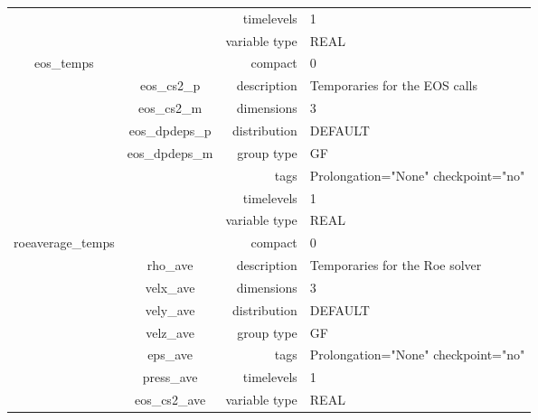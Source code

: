 \begin{tabular*}{150mm}{|c|c@{\extracolsep{\fill}}|rl|}
 &  & timelevels & 1 \\ 
 &  & variable type & REAL \\ 
\hline 
eos\_temps &  & compact & 0 \\ 
 & eos\_cs2\_p & description & Temporaries for the EOS calls \\ 
 & eos\_cs2\_m & dimensions & 3 \\ 
 & eos\_dpdeps\_p & distribution & DEFAULT \\ 
 & eos\_dpdeps\_m & group type & GF \\ 
 &  & tags & Prolongation="None" checkpoint="no" \\ 
 &  & timelevels & 1 \\ 
 &  & variable type & REAL \\ 
\hline 
roeaverage\_temps &  & compact & 0 \\ 
 & rho\_ave & description & Temporaries for the Roe solver \\ 
 & velx\_ave & dimensions & 3 \\ 
 & vely\_ave & distribution & DEFAULT \\ 
 & velz\_ave & group type & GF \\ 
 & eps\_ave & tags & Prolongation="None" checkpoint="no" \\ 
 & press\_ave & timelevels & 1 \\ 
 & eos\_cs2\_ave & variable type & REAL \\ 
\hline 
\end{tabular*} 



\vspace{5mm}
\vspace{5mm}

